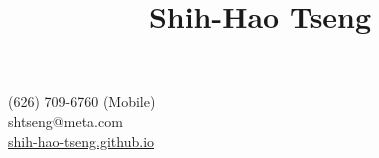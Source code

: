 \title{Shih-Hao Tseng}{
}{
(626) 709-6760 (Mobile)\\
shtseng@meta.com\\
\href{http://shih-hao-tseng.github.io}{shih-hao-tseng.github.io}%
}
